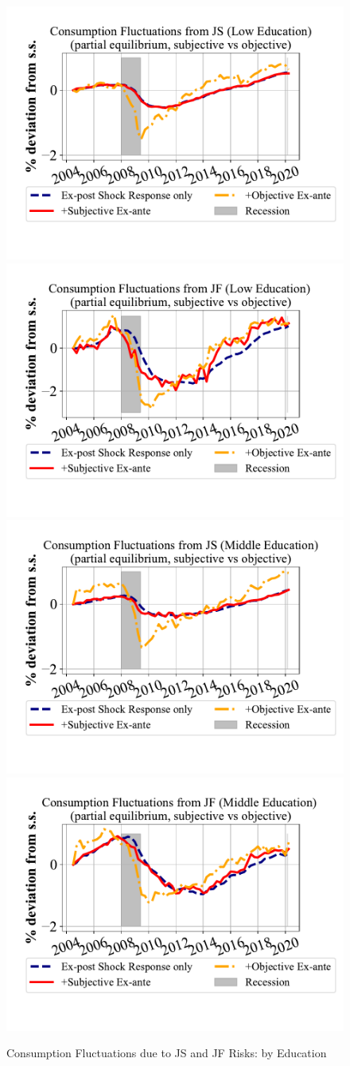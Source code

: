   \begin{figure}
        \centering
          \caption{Consumption Fluctuations due to JS and JF Risks: by Education}
\label{appendix_pe_decompose_sub_obj_educ}
\includegraphics[width=0.4\linewidth]{text/Chapter2/Figures/consumption_pe_JS_deviation_machine_as_rational_LowEdu.pdf}
\includegraphics[width=0.4\linewidth]{text/Chapter2/Figures/consumption_pe_JF_deviation_machine_as_rational_LowEdu.pdf}
\\
\includegraphics[width=0.4\linewidth]{text/Chapter2/Figures/consumption_pe_JS_deviation_machine_as_rational_MidEdu.pdf}
\includegraphics[width=0.4\linewidth]{text/Chapter2/Figures/consumption_pe_JF_deviation_machine_as_rational_MidEdu.pdf}
\\


\end{figure}
